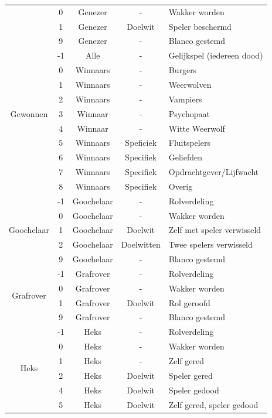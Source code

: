 \documentclass[12pt]{article}
\begin{document}
\begin{center}
\begin{longtable}{c|c|c|c|l}
       & 0 & Genezer & - & Wakker worden \\
       & 1 & Genezer & Doelwit & Speler beschermd \\
       & 9 & Genezer & - & Blanco gestemd \\
      \hline
      \multirow{9}{*}{Gewonnen} & -1 & Alle & - & Gelijkspel (iedereen dood) \\
       & 0 & Winnaars & - & Burgers \\
       & 1 & Winnaars & - & Weerwolven \\
       & 2 & Winnaars & - & Vampiers \\
       & 3 & Winnaar & - & Psychopaat \\
       & 4 & Winnaar & - & Witte Weerwolf \\
       & 5 & Winnaars & Speficiek & Fluitspelers \\
       & 6 & Winnaars & Specifiek & Geliefden \\
       & 7 & Winnaars & Specifiek & Opdrachtgever/Lijfwacht \\
       & 8 & Winnaars & Specifiek & Overig \\
      \hline
      \multirow{5}{*}{Goochelaar} & -1 & Goochelaar & - & Rolverdeling \\
       & 0 & Goochelaar & - & Wakker worden \\
       & 1 & Goochelaar & Doelwit & Zelf met speler verwisseld \\
       & 2 & Goochelaar & Doelwitten & Twee spelers verwisseld \\
       & 9 & Goochelaar & - & Blanco gestemd \\
      \hline
      \multirow{4}{*}{Grafrover} & -1 & Grafrover & - & Rolverdeling \\
       & 0 & Grafrover & - & Wakker worden \\
       & 1 & Grafrover & Doelwit & Rol geroofd \\
       & 9 & Grafrover & - & Blanco gestemd \\
      \hline
      \multirow{8}{*}{Heks} & -1 & Heks & - & Rolverdeling \\
       & 0 & Heks & - & Wakker worden \\
       & 1 & Heks & - & Zelf gered \\
       & 2 & Heks & Doelwit & Speler gered \\
       & 4 & Heks & Doelwit & Speler gedood \\
       & 5 & Heks & Doelwit & Zelf gered, speler gedood \\

\end{longtable}
\end{center}
\end{document}
